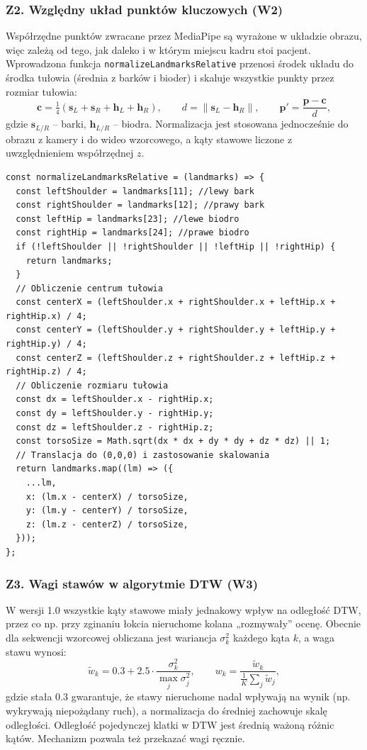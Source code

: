 \documentclass[11pt,a4paper]{article}
\begin{document}
\subsubsection{Z2. Względny układ punktów kluczowych (W2)}
Współrzędne punktów zwracane przez MediaPipe są wyrażone w układzie obrazu, więc zależą od tego, jak daleko i w którym miejscu kadru stoi pacjent. Wprowadzona funkcja \texttt{normalizeLandmarksRelative} przenosi środek układu do środka tułowia (średnia z barków i bioder) i skaluje wszystkie punkty przez rozmiar tułowia:
\[
\mathbf{c} = \tfrac{1}{4}\left(\mathbf{s}_L + \mathbf{s}_R + \mathbf{h}_L + \mathbf{h}_R\right), \qquad
d = \lVert \mathbf{s}_L - \mathbf{h}_R \rVert, \qquad
\mathbf{p}' = \frac{\mathbf{p} - \mathbf{c}}{d},
\]
gdzie $\mathbf{s}_{L/R}$ -- barki, $\mathbf{h}_{L/R}$ -- biodra. Normalizacja jest stosowana jednocześnie do obrazu z kamery i do wideo wzorcowego, a kąty stawowe liczone z uwzględnieniem współrzędnej $z$.

\begin{lstlisting}[caption={Normalizacja punktów względem tułowia (\texttt{PoseDetector.js}).}]
const normalizeLandmarksRelative = (landmarks) => {
  const leftShoulder = landmarks[11]; //lewy bark
  const rightShoulder = landmarks[12]; //prawy bark
  const leftHip = landmarks[23]; //lewe biodro
  const rightHip = landmarks[24]; //prawe biodro
  if (!leftShoulder || !rightShoulder || !leftHip || !rightHip) {
    return landmarks;
  }
  // Obliczenie centrum tułowia
  const centerX = (leftShoulder.x + rightShoulder.x + leftHip.x + rightHip.x) / 4;
  const centerY = (leftShoulder.y + rightShoulder.y + leftHip.y + rightHip.y) / 4;
  const centerZ = (leftShoulder.z + rightShoulder.z + leftHip.z + rightHip.z) / 4;
  // Obliczenie rozmiaru tułowia
  const dx = leftShoulder.x - rightHip.x;
  const dy = leftShoulder.y - rightHip.y;
  const dz = leftShoulder.z - rightHip.z;
  const torsoSize = Math.sqrt(dx * dx + dy * dy + dz * dz) || 1;
  // Translacja do (0,0,0) i zastosowanie skalowania
  return landmarks.map((lm) => ({
    ...lm,
    x: (lm.x - centerX) / torsoSize,
    y: (lm.y - centerY) / torsoSize,
    z: (lm.z - centerZ) / torsoSize,
  }));
};
\end{lstlisting}

\subsubsection{Z3. Wagi stawów w algorytmie DTW (W3)}
W wersji 1.0 wszystkie kąty stawowe miały jednakowy wpływ na odległość DTW, przez co np. przy zginaniu łokcia nieruchome kolana „rozmywały'' ocenę. Obecnie dla sekwencji wzorcowej obliczana jest wariancja $\sigma_k^2$ każdego kąta $k$, a waga stawu wynosi:
\[
\tilde{w}_k = 0.3 + 2.5\cdot\frac{\sigma_k^2}{\max_j \sigma_j^2}, \qquad
w_k = \frac{\tilde{w}_k}{\tfrac{1}{K}\sum_{j}\tilde{w}_j},
\]
gdzie stała $0.3$ gwarantuje, że stawy nieruchome nadal wpływają na wynik (np. wykrywają niepożądany ruch), a normalizacja do średniej zachowuje skalę odległości. Odległość pojedynczej klatki w DTW jest średnią ważoną różnic kątów. Mechanizm pozwala też przekazać wagi ręcznie.
\end{document}
